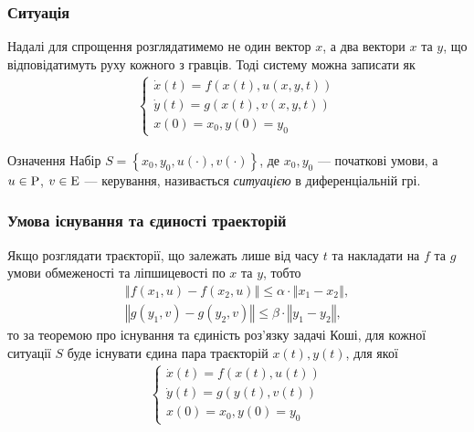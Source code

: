 \documentclass[10pt,pdf,aspectratio=169]{beamer}
\renewcommand{\d}[1]{\dot{#1}}
\renewcommand{\l}{\left}
\renewcommand{\r}{\right}
\newcommand{\norm}[1]{\left\Vert #1 \right\Vert}
\begin{document}
    \begin{frame}
        \frametitle{Ситуація}
    
        Надалі для спрощення розглядатимемо не один вектор $x$, а два вектори $x$ та $y$, що відповідатимуть руху кожного з гравців. Тоді
        систему можна записати як
        \begin{gather*}
            \begin{cases}
                \d{x}(t) = f(x(t), u(x, y, t)) \\
                \d{y}(t) = g(x(t), v(x, y, t)) \\
                x(0) = x_0, y(0) = y_0
            \end{cases}
        \end{gather*}

        \begin{block}{Означення}
            Набір $S = \l\{x_0, y_0, u(\cdot), v(\cdot) \r\}$, де $x_0, y_0$ --- початкові умови, а $u \in \rm P$, $v \in \rm E$ --- керування, 
            називається \emph{ситуацією} в диференціальній грі.
        \end{block}

        
    \end{frame}
    \begin{frame}
        \frametitle{Умова існування та єдиності траекторій}
    
        Якщо розглядати траєкторії, що залежать лише від часу $t$ та накладати на $f$ та $g$ умови
        обмеженості та ліпшицевості по $x$ та $y$, тобто
        \begin{gather*}
            \norm{f(x_1, u) - f(x_2, u)} \leq \alpha \cdot \norm{x_1 - x_2}, \\
            \norm{g(y_1, v) - g(y_2, v)} \leq \beta \cdot \norm{y_1 - y_2},
        \end{gather*}
        то за теоремою про існування та єдиність роз'язку задачі Коші, для кожної ситуації $S$ буде існувати єдина пара траєкторій $x(t), y(t)$,
        для якої 
        \begin{gather*}
            \begin{cases}
                \d{x}(t) = f(x(t), u(t)) \\
                \d{y}(t) = g(y(t), v(t)) \\
                x(0) = x_0, y(0) = y_0
            \end{cases}
        \end{gather*}
    \end{frame}
\end{document}
